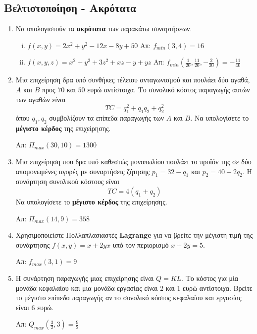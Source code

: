 \documentclass[a4paper,table]{report}
\begin{document}
\subsection*{Βελτιστοποίηση - Ακρότατα}

\begin{enumerate}
  \item Να υπολογιστούν τα \textbf{ακρότατα} των παρακάτω συναρτήσεων.
    \begin{enumerate}[i)]
      \item $ f(x,y) = 2x^{2}+y^{2} -12x-8y+50 $ \hfill Απ: $ f_{min}(3,4) = 16 $ 
      \item $ f(x,y,z) = x^{2}+y^{2}+3z^{2}+xz-y+yz $ \hfill Απ: $ f_{min}(\frac{1}{20}
        , \frac{11}{20} , - \frac{2}{20}) = - \frac{11}{40} $ 
    \end{enumerate}

  \item Μια επιχείρηση δρα υπό συνθήκες τέλειου ανταγωνισμού και πουλάει δύο αγαθά, $A$
    και $B$ προς $ 70 $ και $ 50 $ ευρώ αντίστοιχα. Το συνολικό κόστος παραγωγής αυτών 
    των αγαθών είναι 
    \[
      TC = q_{1}^{2}+ q_{1}q_{2} + q_{2}^{2}
    \]
    όπου $ q_{1}, q_{2} $ συμβολίζουν τα επίπεδα παραγωγής των $A$ και $B$. Να 
    υπολογίσετε το \textbf{μέγιστο κέρδος} της επιχείρησης.

    {}
    \hfill Απ: $ \Pi_{max}(30,10) = 1300$ 

  \item Μια επιχείρηση που δρα υπό καθεστώς μονοπωλίου πουλάει το προϊόν της σε δύο 
    απομονωμένες αγορές με συναρτήσεις ζήτησης $ p_{1}=32- q_{1} $ και $ p_{2}=40-2 q_{2}
    $. Η συνάρτηση συνολικού κόστους είναι 
    \[
      TC = 4(q_{1}+q_{2}) 
    \] 
    Να υπολογίσετε το \textbf{μέγιστο κέρδος} της επιχείρησης.

    {}

    \hfill Απ: $ \Pi_{max}(14,9) = 358$ 

  \item Χρησιμοποιείστε Πολλαπλασιαστές \textbf{Lagrange} για να βρείτε την 
    μέγιστη τιμή της συνάρτησης $ f(x,y) = x+2yx $ υπό τον περιορισμό $ x+2y=5 $.

    \hfill Απ: $ f_{max}(3,1)=9 $ 

  \item Η συνάρτηση παραγωγής μιας επιχείρησης είναι $ Q=KL $. Το κόστος για μία μονάδα 
    κεφαλαίου και μια μονάδα εργασίας είναι 2 και 1 ευρώ αντίστοιχα. Βρείτε το μέγιστο 
    επίπεδο παραγωγής αν το συνολικό κόστος κεφαλαίου και εργασίας είναι 6 ευρώ.

    \hfill Απ: $ Q_{max}(\frac{3}{2} , 3) = \frac{9}{2} $ 
\end{enumerate}
\end{document}
